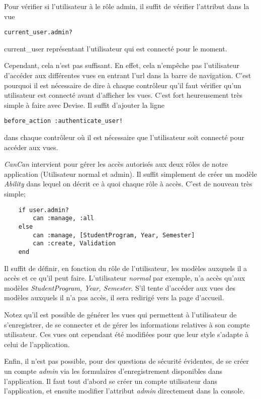 Pour vérifier si l'utilisateur à le rôle admin, il suffit de vérifier l'attribut dans la vue

\begin{lstlisting}
current_user.admin?
\end{lstlisting}

current\_user représentant l'utilisateur qui est connecté pour le moment.


Cependant, cela n'est pas suffisant. En effet, cela n'empêche pas l'utilisateur d'accéder aux différentes vues en entrant l'url dans la barre de navigation. C'est pourquoi il est nécessaire de dire à chaque contrôleur qu'il faut vérifier qu'un utilisateur est connecté avant d'afficher les vues. C'est fort heureusement très simple à faire avec Devise. Il suffit d'ajouter la ligne 
\begin{lstlisting}
before_action :authenticate_user!
\end{lstlisting}

dans chaque contrôleur où il est nécessaire que l'utilisateur soit connecté pour accéder aux vues. 

\textit{CanCan} intervient pour gérer les accès autorisés aux deux rôles de notre application (Utilisateur normal et admin). Il suffit simplement de créer un modèle \textit{Ability} dans lequel on décrit ce à quoi chaque rôle à accès. C'est de nouveau très simple;

\begin{lstlisting}
    if user.admin?
        can :manage, :all
    else
        can :manage, [StudentProgram, Year, Semester]
        can :create, Validation
    end
\end{lstlisting}

Il suffit de définir, en fonction du rôle de l'utilisateur, les modèles auxquels il a accès et ce qu'il peut faire. L'utilisateur \textit{normal} par exemple, n'a accès qu'aux modèles \textit{StudentProgram, Year, Semester}. S'il tente d'accéder aux vues des modèles auxquels il n'a pas accès, il sera redirigé vers la page d’accueil. 

Notez qu'il est possible de générer les vues qui permettent à l'utilisateur de s'enregistrer, de se connecter et de gérer les informations relatives à son compte utilisateur. Ces vues ont cependant été modifiées pour que leur style s'adapte à celui de l'application. 

Enfin, il n'est pas possible, pour des questions de sécurité évidentes, de se créer un compte \textit{admin} via les formulaires d'enregistrement disponibles dans l'application. Il faut tout d'abord se créer un compte utilisateur dans l'application, et ensuite modifier l'attribut \textit{admin} directement dans la console.  

